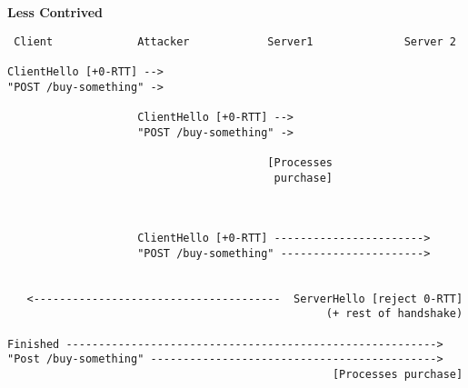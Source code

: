 \documentclass[helvetica]{seminar}
\newcommand{\heading}[1]{%
  \begin{center} 
    \large\bf 
    #1 
  \end{center} 
  \vspace{.4 in}}
\begin{document}
\begin{slide}
\heading{Less Contrived}

\vspace{-.45in}
{\scriptsize
\begin{verbatim}
 Client             Attacker            Server1              Server 2

ClientHello [+0-RTT] -->
"POST /buy-something" ->               

                    ClientHello [+0-RTT] -->
                    "POST /buy-something" ->
                                       
                                        [Processes
                                         purchase]               



                    ClientHello [+0-RTT] ----------------------->
                    "POST /buy-something" ---------------------->


   <--------------------------------------  ServerHello [reject 0-RTT]
                                                 (+ rest of handshake)

Finished --------------------------------------------------------->
"Post /buy-something" -------------------------------------------->
                                                  [Processes purchase]
\end{verbatim}
}
\end{slide}
\end{document}
